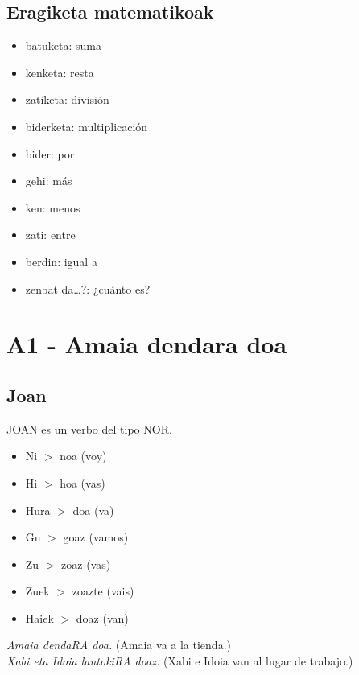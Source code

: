 \documentclass[11pt, a4paper]{article}
\begin{document}
\subsection{Eragiketa matematikoak}
\begin{multicols}{2}
\begin{itemize}
\item batuketa: suma
\item kenketa: resta
\item zatiketa: división
\item biderketa: multiplicación
\item bider: por
\item gehi: más
\item ken: menos
\item zati: entre
\item berdin: igual a
\item zenbat da…?: ¿cuánto es?
\end{itemize}
\end{multicols}

\section{A1 - Amaia dendara doa}
\subsection{Joan}
\noindent JOAN es un verbo del tipo NOR.
\begin{multicols}{2}
\begin{itemize}
\item Ni $>$ noa (voy)
\item Hi $>$ hoa (vas)
\item Hura $>$ doa (va)\\
\item Gu $>$ goaz (vamos)
\item Zu $>$ zoaz (vas)
\item Zuek $>$ zoazte (vais)
\item Haiek $>$ doaz (van)
\end{itemize}
\end{multicols}

\indent \textit{Amaia dendaRA doa.} (Amaia va a la tienda.)\\
\indent \textit{Xabi eta Idoia lantokiRA doaz.} (Xabi e Idoia van al lugar de trabajo.)\\
\end{document}
